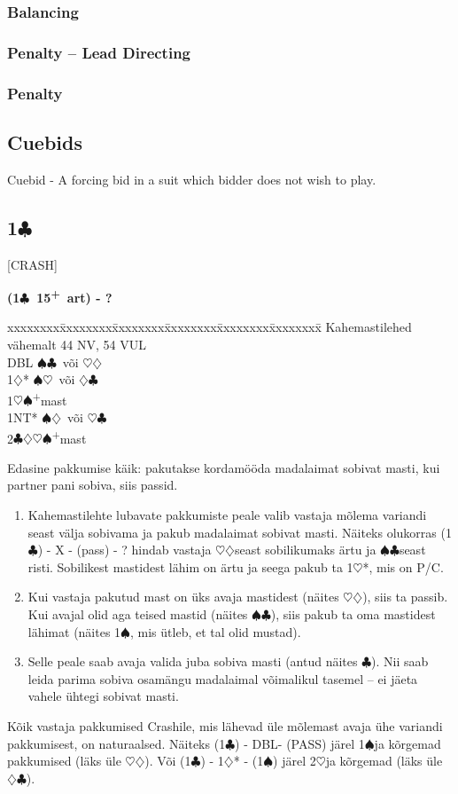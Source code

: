 \documentclass[10pt]{article}
\renewcommand{\c}{$\clubsuit$}
\renewcommand{\d}{$\diamondsuit$}
\newcommand{\h}{$\heartsuit$}
\newcommand{\s}{$\spadesuit$}
\newcommand{\p}{\textsuperscript{+}}
\newcommand{\x}{DBL}
\newenvironment{bidtable}[1][]
{\textbf{#1}
  \begin{adjustwidth}{1em}{}
    \addvspace{2pt}
    \begin{tabbing}
      xxxxxxxx\=xxxxxxxx\=xxxxxxxx\=xxxxxxxx\=xxxxxxxx\=xxxxxxxx\=\kill}
{\end{tabbing}\end{adjustwidth}\bigskip}%
\newcommand{\pdfc}{\texorpdfstring{\c{}}{C}}
\begin{document}
\begin{multicols*}{2}
\subsubsection{Balancing}

\subsubsection{Penalty -- Lead Directing}

\subsubsection{Penalty}




\subsection{Cuebids}
Cuebid - A forcing bid in a suit which bidder does not wish to play.

\subsection{1\pdfc}

[CRASH]

\begin{bidtable}[(1\c\ 15\p\ art) - ?]
Kahemastilehed vähemalt 44 NV, 54 VUL \\
\x        \> \s\c\ või \h\d\          \\
1\d*      \> \s\h\ või \d\c           \\
1\h\s     {}\p mast                 \\
1NT*      \> \s\d\ või \h\c\          \\
2\c\d\h\s {}\p mast
\end{bidtable}

Edasine pakkumise käik: pakutakse kordamööda madalaimat sobivat masti, kui partner pani sobiva, siis passid.
\begin{enumerate}
\item Kahemastilehte lubavate pakkumiste peale valib vastaja mõlema variandi seast välja sobivama ja pakub madalaimat sobivat masti. Näiteks olukorras (1\c) - X - (pass) - ? hindab vastaja \h\d seast sobilikumaks ärtu ja \s\c seast risti. Sobilikest mastidest lähim on ärtu ja seega pakub ta 1\h*, mis on P/C.
\item  Kui vastaja pakutud mast on üks avaja mastidest (näites \h\d), siis ta passib. Kui avajal olid aga teised mastid (näites \s\c), siis pakub ta oma mastidest lähimat (näites 1\s, mis ütleb, et tal olid mustad).
\item  Selle peale saab avaja valida juba sobiva masti (antud näites \c). Nii saab leida parima sobiva osamängu madalaimal võimalikul tasemel – ei jäeta vahele ühtegi sobivat masti.
\end{enumerate}
Kõik vastaja pakkumised Crashile, mis lähevad üle mõlemast avaja ühe variandi pakkumisest, on naturaalsed. Näiteks (1\c) - \x - (PASS) järel 1\s ja kõrgemad pakkumised (läks üle \h\d). Või (1\c) - 1\d* - (1\s) järel 2\h ja kõrgemad (läks üle \d\c).


\end{multicols*}
\end{document}
